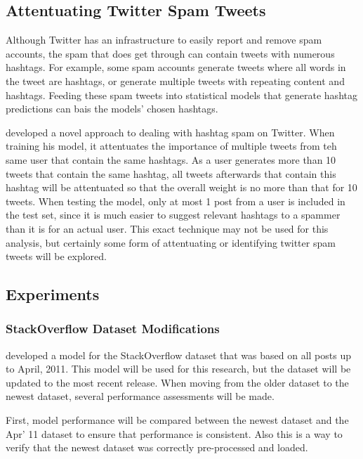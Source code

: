 \documentclass[man,floatsintext]{apa6}
\begin{document}
\subsection{Attentuating Twitter Spam Tweets}

Although Twitter has an infrastructure to easily report and remove spam accounts, the spam that does get through can contain tweets with numerous hashtags.
For example, some spam accounts generate tweets where all words in the tweet are hashtags, or generate multiple tweets with repeating content and hashtags.
Feeding these spam tweets into statistical models that generate hashtag predictions can bais the models' chosen hashtags.

\textcite{Mazzia2009} developed a novel approach to dealing with hashtag spam on Twitter.
When training his model, it attentuates the importance of multiple tweets from teh same user that contain the same hashtags.
As a user generates more than 10 tweets that contain the same hashtag, all tweets afterwards that contain this hashtag will be attentuated so that the overall weight is no more than that for 10 tweets.
When testing the model, only at most 1 post from a user is included in the test set, since it is much easier to suggest relevant hashtags to a spammer than it is for an actual user.
This exact technique may not be used for this analysis, but certainly some form of attentuating or identifying twitter spam tweets will be explored.

\subsection{Experiments}

\subsubsection{StackOverflow Dataset Modifications}

\textcite{Stanley2013} developed a model for the StackOverflow dataset that was based on all posts up to April, 2011.
This model will be used for this research, but the dataset will be updated to the most recent release.
When moving from the older dataset to the newest dataset, several performance assessments will be made.

First, model performance will be compared between the newest dataset and the Apr' 11 dataset to ensure that performance is consistent.
Also this is a way to verify that the newest dataset was correctly pre-processed and loaded.
\end{document}
